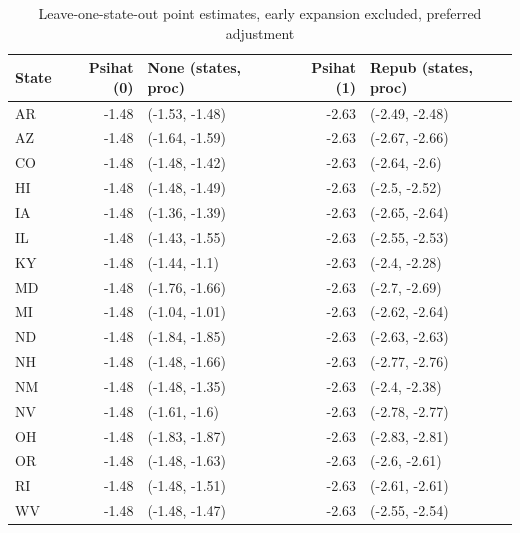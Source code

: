 \documentclass[12pt]{article}
\begin{document}
\begin{table}[ht]
\centering
\begin{tabular}{lrlrl}
  \toprule
State & Psihat (0) & None (states, proc) & Psihat (1) & Repub (states, proc) \\ 
  \midrule
AR & -1.48 & (-1.53, -1.48) & -2.63 & (-2.49, -2.48) \\ 
  AZ & -1.48 & (-1.64, -1.59) & -2.63 & (-2.67, -2.66) \\ 
  CO & -1.48 & (-1.48, -1.42) & -2.63 & (-2.64, -2.6) \\ 
  HI & -1.48 & (-1.48, -1.49) & -2.63 & (-2.5, -2.52) \\ 
  IA & -1.48 & (-1.36, -1.39) & -2.63 & (-2.65, -2.64) \\ 
  IL & -1.48 & (-1.43, -1.55) & -2.63 & (-2.55, -2.53) \\ 
  KY & -1.48 & (-1.44, -1.1) & -2.63 & (-2.4, -2.28) \\ 
  MD & -1.48 & (-1.76, -1.66) & -2.63 & (-2.7, -2.69) \\ 
  MI & -1.48 & (-1.04, -1.01) & -2.63 & (-2.62, -2.64) \\ 
  ND & -1.48 & (-1.84, -1.85) & -2.63 & (-2.63, -2.63) \\ 
  NH & -1.48 & (-1.48, -1.66) & -2.63 & (-2.77, -2.76) \\ 
  NM & -1.48 & (-1.48, -1.35) & -2.63 & (-2.4, -2.38) \\ 
  NV & -1.48 & (-1.61, -1.6) & -2.63 & (-2.78, -2.77) \\ 
  OH & -1.48 & (-1.83, -1.87) & -2.63 & (-2.83, -2.81) \\ 
  OR & -1.48 & (-1.48, -1.63) & -2.63 & (-2.6, -2.61) \\ 
  RI & -1.48 & (-1.48, -1.51) & -2.63 & (-2.61, -2.61) \\ 
  WV & -1.48 & (-1.48, -1.47) & -2.63 & (-2.55, -2.54) \\ 
   \bottomrule
\end{tabular}
   \caption{Leave-one-state-out point estimates, early expansion excluded, preferred adjustment}
    \label{tab:loostatec2}
\end{table}
\end{document}
